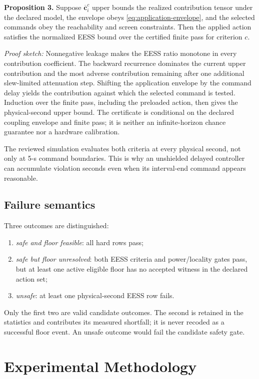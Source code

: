 \documentclass[journal]{IEEEtran}
\begin{document}
\textbf{Proposition 3.} Suppose $\overline{\bm c}^{c}_{i}$ upper bounds the realized contribution tensor under the declared model, the envelope obeys \eqref{eq:application-envelope}, and the selected commands obey the reachability and screen constraints. Then the applied action satisfies the normalized EESS bound over the certified finite pass for criterion $c$.

\emph{Proof sketch:} Nonnegative leakage makes the EESS ratio monotone in every contribution coefficient. The backward recurrence dominates the current upper contribution and the most adverse contribution remaining after one additional slew-limited attenuation step. Shifting the application envelope by the command delay yields the contribution against which the selected command is tested. Induction over the finite pass, including the preloaded action, then gives the physical-second upper bound. The certificate is conditional on the declared coupling envelope and finite pass; it is neither an infinite-horizon chance guarantee nor a hardware calibration.

The reviewed simulation evaluates both criteria at every physical second, not only at 5-s command boundaries. This is why an unshielded delayed controller can accumulate violation seconds even when its interval-end command appears reasonable.

\subsection{Failure semantics}
Three outcomes are distinguished:
\begin{enumerate}
\item \emph{safe and floor feasible}: all hard rows pass;
\item \emph{safe but floor unresolved}: both EESS criteria and power/locality gates pass, but at least one active eligible floor has no accepted witness in the declared action set;
\item \emph{unsafe}: at least one physical-second EESS row fails.
\end{enumerate}
Only the first two are valid candidate outcomes. The second is retained in the statistics and contributes its measured shortfall; it is never recoded as a successful floor event. An unsafe outcome would fail the candidate safety gate.

\section{Experimental Methodology}
\end{document}
